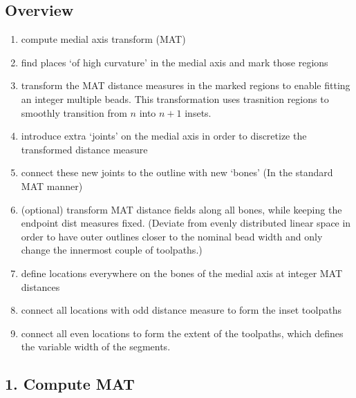 \subsection{Overview}
\begin{enumerate}
\item compute medial axis transform (MAT)
\item find places `of high curvature' in the medial axis and mark those regions
\item transform the MAT distance measures in the marked regions to enable fitting an integer multiple beads.
		This transformation uses trasnition regions to smoothly transition from $n$ into $n+1$ insets.
\item introduce extra `joints' on the medial axis in order to discretize the transformed distance measure
\item connect these new joints to the outline with new `bones' (In the standard MAT manner)
\item (optional) transform MAT distance fields along all bones, while keeping the endpoint dist measures fixed. (Deviate from evenly distributed linear space in order to have outer outlines closer to the nominal bead width and only change the innermost couple of toolpaths.)
\item define locations everywhere on the bones of the medial axis at integer MAT distances
\item connect all locations with odd distance measure to form the inset toolpaths
\item connect all even locations to form the extent of the toolpaths, which defines the variable width of the segments.
\end{enumerate}








\subsection{1. Compute MAT}

